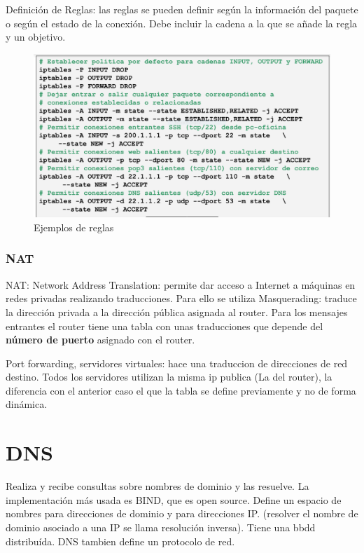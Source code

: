 \begin{itemize}
    Definición de Reglas: las reglas se pueden definir según la información del paquete o según el estado de la conexión. Debe incluir la cadena a la que se añade la regla y un objetivo.
    \begin{figure}[H]
        \centering
        \includegraphics[width=\textwidth]{img/EjemplosReglas.PNG}
        \caption{Ejemplos de reglas}
    \end{figure}
    \subsubsection{NAT}
    NAT: Network Address Translation: permite dar acceso a Internet a máquinas en redes privadas realizando traducciones. Para ello se utiliza Masquerading: traduce la dirección privada a la dirección pública asignada al router. Para los mensajes entrantes el router tiene una tabla con unas traducciones que depende del \textbf{número de puerto} asignado con el router.
    
    Port forwarding, servidores virtuales: hace una traduccion de direcciones de red destino. Todos los servidores utilizan la misma ip publica (La del router), la diferencia con el anterior caso el que la tabla se define previamente y no de forma dinámica.
\end{itemize}

\section{DNS}
Realiza y recibe consultas sobre nombres de dominio y las resuelve. La implementación más usada es BIND, que es open source. Define un espacio de nombres para direcciones de dominio y para direcciones IP. (resolver el nombre de dominio asociado a una IP se llama resolución inversa). Tiene una bbdd distribuída. DNS tambien define un protocolo de red.

